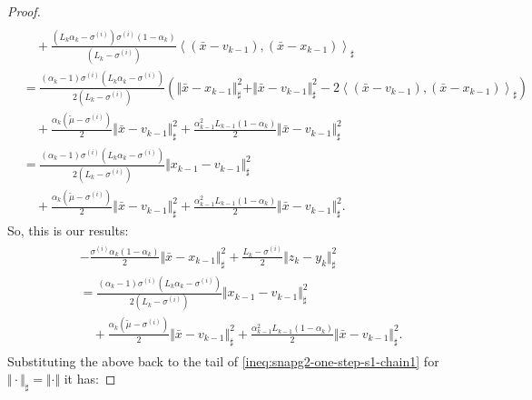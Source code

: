\documentclass[12pt]{article}
\begin{document}
\begin{proof}
{\begin{align*}
                \\ &\quad
                + \frac{(L_k\alpha_k  - \sigma^{(i)})\sigma^{(i)}(1 - \alpha_k)}{(L_k - \sigma^{(i)})}\left\langle (\bar x - v_{k - 1}),(\bar x - x_{k - 1})\right\rangle_\sharp
            \\
            &= 
            \frac{(\alpha_k - 1)\sigma^{(i)}\left(L_k\alpha_k - \sigma^{(i)}\right)}{2\left(L_k - \sigma^{(i)}\right)}
            \left(
                \Vert \bar x - x_{k - 1}\Vert^2_\sharp 
                + \Vert \bar x - v_{k - 1}\Vert^2_\sharp 
                - 2\left\langle (\bar x - v_{k - 1}),(\bar x - x_{k - 1})\right\rangle_\sharp
            \right) 
                \\ &\quad 
                + \frac{\alpha_k(\tilde\mu - \sigma^{(i)})}{2} \Vert \bar x - v_{k - 1}\Vert^2_\sharp
                + \frac{\alpha_{k - 1}^2L_{k - 1}(1 - \alpha_k)}{2} \Vert \bar x - v_{k - 1}\Vert^2_\sharp
            \\
            &= \frac{(\alpha_k - 1)\sigma^{(i)}\left(L_k\alpha_k - \sigma^{(i)}\right)}{2\left(L_k - \sigma^{(i)}\right)}
                \Vert x_{k - 1} - v_{k - 1} \Vert^2_\sharp
                \\ &\quad 
                + \frac{\alpha_k(\tilde\mu - \sigma^{(i)})}{2} \Vert \bar x - v_{k - 1}\Vert^2_\sharp
                + \frac{\alpha_{k - 1}^2L_{k - 1}(1 - \alpha_k)}{2} \Vert \bar x - v_{k - 1}\Vert^2_\sharp.
        \end{align*}
        }
        So, this is our results: 
        \begin{align}\begin{split}\label{eqn:snapg2-one-spte-s1-chain2}
            & - \frac{\sigma^{(i)}\alpha_k(1 - \alpha_k)}{2}\Vert \bar x - x_{k - 1}\Vert^2_\sharp
            + \frac{L_k - \sigma^{(i)}}{2}\Vert z_k - y_k\Vert^2_\sharp
            \\
            &= 
            \frac{(\alpha_k - 1)\sigma^{(i)}\left(L_k\alpha_k - \sigma^{(i)}\right)}{2\left(L_k - \sigma^{(i)}\right)}
                \Vert x_{k - 1} - v_{k - 1} \Vert^2_\sharp
                \\ &\quad 
                + \frac{\alpha_k(\tilde\mu - \sigma^{(i)})}{2} \Vert \bar x - v_{k - 1}\Vert^2_\sharp
                + \frac{\alpha_{k - 1}^2L_{k - 1}(1 - \alpha_k)}{2} \Vert \bar x - v_{k - 1}\Vert^2_\sharp.
        \end{split}\end{align}
        Substituting the above back to the tail of \eqref{ineq:snapg2-one-step-s1-chain1} for $\Vert \cdot\Vert_\sharp = \Vert \cdot\Vert$ it has: 

\end{proof}
\end{document}
